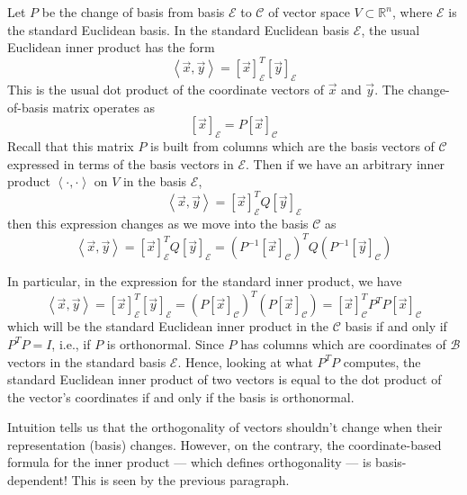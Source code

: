 Let $P$ be the change of basis from basis $\mathcal{E}$ to $\mathcal{C}$ of vector space $V \subset \mathbb{R}^n$, where $\mathcal{E}$ is the standard Euclidean basis. In the standard Euclidean basis $\mathcal{E}$, the usual Euclidean inner product has the form \[ \left\langle \vec{x}, \vec{y} \right\rangle = \left[ \vec{x}\right]^T_{\mathcal{E}} \left[ \vec{y}\right]_{\mathcal{E}} \] This is the usual dot product of the coordinate vectors of $\vec{x}$ and $\vec{y}$. The change-of-basis matrix operates as \[ \left[ \vec{x} \right]_{\mathcal{E}}=P\left[ \vec{x} \right]_{\mathcal{C}} \] Recall that this matrix $P$ is built from columns which are the basis vectors of $\mathcal{C}$ expressed in terms of the basis vectors in $\mathcal{E}$. Then if we have an arbitrary inner product $\left\langle \cdot, \cdot \right\rangle $ on $V$ in the basis $\mathcal{E}$, \[ \left\langle \vec{x}, \vec{y} \right\rangle = \left[ \vec{x} \right]_{\mathcal{E}}^T Q \left[ \vec{y}\right]_{\mathcal{E}} \] then this expression changes as we move into the basis $\mathcal{C}$ as
\[ \left\langle \vec{x}, \vec{y} \right\rangle = \left[ \vec{x} \right]_{\mathcal{E}}^T Q \left[ \vec{y}\right]_{\mathcal{E}} = \left(P^{-1}\left[ \vec{x} \right]_{\mathcal{C}}\right)^T Q \left(P^{-1}\left[ \vec{y}\right]_{\mathcal{C}} \right) \]

In particular, in the expression for the standard inner product, we have \[ \left\langle \vec{x}, \vec{y} \right\rangle = \left[ \vec{x}\right]^T_{\mathcal{E}} \left[ \vec{y}\right]_{\mathcal{E}} = \left(P \left[ \vec{x}\right]_{\mathcal{C}} \right)^T \left(P \left[ \vec{x}\right]_{\mathcal{C}} \right)  =  \left[ \vec{x}\right]_{\mathcal{C}}^T P^TP \left[ \vec{x}\right]_{\mathcal{C}} \] which will be the standard Euclidean inner product in the $\mathcal{C}$ basis if and only if $P^TP = I$, i.e., if $P$ is orthonormal. Since $P$ has columns which are coordinates of $\mathcal{B}$ vectors in the standard basis $\mathcal{E}$. Hence, looking at what $P^TP$ computes, the standard Euclidean inner product of two vectors is equal to the dot product of the vector's coordinates if and only if the basis is orthonormal.

Intuition tells us that the orthogonality of vectors shouldn't change when their representation (basis) changes. However, on the contrary, the coordinate-based formula for the inner product --- which defines orthogonality --- is basis-dependent! This is seen by the previous paragraph.

